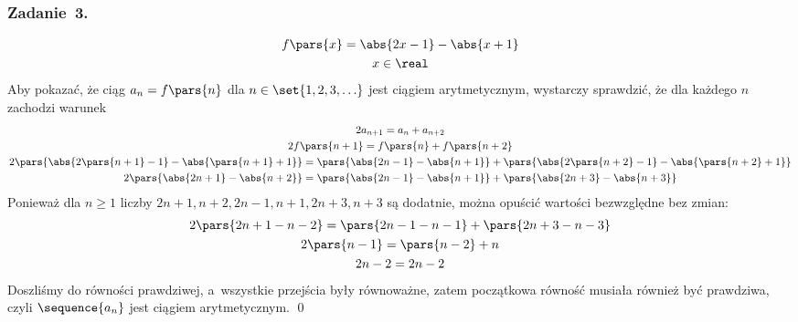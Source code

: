 \subsubsection*{Zadanie~3.}
\begin{gather*}
    f\pars{x} = \abs{2x - 1} - \abs{x + 1}\\
    x \in \real
\end{gather*}
Aby pokazać, że ciąg \(a_n = f\pars{n}\) dla \(n \in \set{1, 2, 3, \ldots}\) jest ciągiem arytmetycznym, wystarczy sprawdzić, że dla każdego \(n\) zachodzi warunek
\begin{gather*}
    2a_{n + 1} = a_n + a_{n + 2}\\
    2f\pars{n + 1} = f\pars{n} + f\pars{n + 2}\\
    2\pars{\abs{2\pars{n + 1} - 1} - \abs{\pars{n + 1} + 1}} = \pars{\abs{2n - 1} - \abs{n + 1}} + \pars{\abs{2\pars{n + 2} - 1} - \abs{\pars{n + 2} + 1}}\\
    2\pars{\abs{2n + 1} - \abs{n + 2}} = \pars{\abs{2n - 1} - \abs{n + 1}} + \pars{\abs{2n + 3} - \abs{n + 3}}
\end{gather*}
Ponieważ dla \(n \geq 1\) liczby \(2n + 1, n + 2, 2n - 1, n + 1, 2n + 3, n + 3\) są dodatnie, można opuścić wartości bezwzględne bez zmian:
\begin{gather*}
    2\pars{2n + 1 - n  - 2} = \pars{2n - 1 - n - 1} + \pars{2n + 3 - n - 3}\\
    2\pars{n - 1} = \pars{n - 2} + n\\
    2n - 2 = 2n - 2
\end{gather*}
Doszliśmy do równości prawdziwej, a~wszystkie przejścia były równoważne, zatem początkowa równość musiała również być prawdziwa, czyli \(\sequence{a_n}\) jest ciągiem arytmetycznym.
\qed
